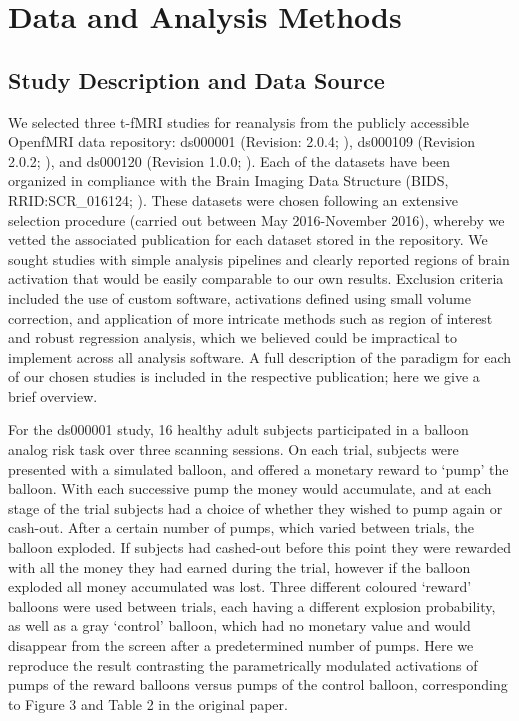 \section{Data and Analysis Methods}

\subsection{Study Description and Data Source}
We selected three t-fMRI studies for reanalysis from the publicly accessible OpenfMRI data repository: ds000001 (Revision: 2.0.4; \citep{Schonberg2012-oo}), ds000109 (Revision 2.0.2; \citep{Moran2012-cw}), and ds000120 (Revision 1.0.0; \citep{Padmanabhan2011-dc}). Each of the datasets have been organized in compliance with the Brain Imaging Data Structure (BIDS, RRID:SCR\_016124; \citep{Gorgolewski2016-nf}). These datasets were chosen following an extensive selection procedure (carried out between May 2016-November 2016), whereby we vetted the associated publication for each dataset stored in the repository. We sought studies with simple analysis pipelines and clearly reported regions of brain activation that would be easily comparable to our own results. Exclusion criteria included the use of custom software, activations defined using small volume correction, and application of more intricate methods such as region of interest and robust regression analysis, which we believed could be impractical to implement across all analysis software. A full description of the paradigm for each of our chosen studies is included in the respective publication; here we give a brief overview. 

For the ds000001 study, 16 healthy adult subjects participated in a balloon analog risk task over three scanning sessions. On each trial, subjects were presented with a simulated balloon, and offered a monetary reward to `pump' the balloon. With each successive pump the money would accumulate, and at each stage of the trial subjects had a choice of whether they wished to pump again or cash-out. After a certain number of pumps, which varied between trials, the balloon exploded. If subjects had cashed-out before this point they were rewarded with all the money they had earned during the trial, however if the balloon exploded all money accumulated was lost. Three different coloured `reward' balloons were used between trials, each having a different explosion probability, as well as a gray `control' balloon, which had no monetary value and would disappear from the screen after a predetermined number of pumps. Here we reproduce the result contrasting the parametrically modulated activations of pumps of the reward balloons versus pumps of the control balloon, corresponding to Figure 3 and Table 2 in the original paper.

